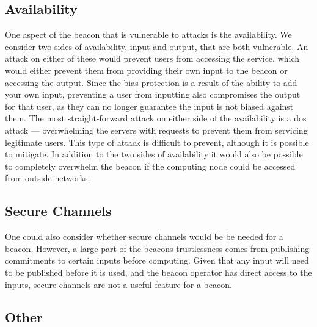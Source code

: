 \subsection{Availability}
One aspect of the beacon that is vulnerable to attacks is the availability. We consider two sides of availability, input and output, that are both vulnerable. An attack on either of these would prevent users from accessing the service, which would either prevent them from providing their own input to the beacon or accessing the output. Since the bias protection is a result of the ability to add your own input, preventing a user from inputting also compromises the output for that user, as they can no longer guarantee the input is not biased against them.
The most straight-forward attack on either side of the availability is a \gls{dos} attack --- overwhelming the servers with requests to prevent them from servicing legitimate users. This type of attack is difficult to prevent, although it is possible to mitigate. %
In addition to the two sides of availability it would also be possible to completely overwhelm the beacon if the computing node could be accessed from outside networks.

\subsection{Secure Channels}
One could also consider whether secure channels would be be needed for a beacon. However, a large part of the beacons trustlessness comes from publishing commitments to certain inputs before computing. Given that any input will need to be published before it is used, and the beacon operator has direct access to the inputs, secure channels are not a useful feature for a beacon.

\subsection{Other}
